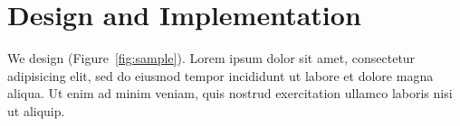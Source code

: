 \section{Design and Implementation}
\label{s:design}

We design (Figure~\ref{fig:sample}). Lorem ipsum dolor sit amet,
consectetur adipisicing elit, sed do eiusmod tempor incididunt ut
labore et dolore magna aliqua. Ut enim ad minim veniam, quis nostrud
exercitation ullamco laboris nisi ut aliquip.


